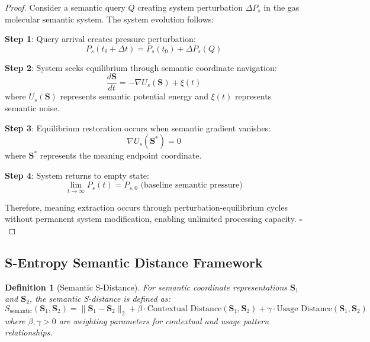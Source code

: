 \documentclass[12pt,a4paper]{article}
\newtheorem{definition}{Definition}
\begin{document}
\begin{proof}
Consider a semantic query $Q$ creating system perturbation $\Delta P_s$ in the gas molecular semantic system. The system evolution follows:

\textbf{Step 1}: Query arrival creates pressure perturbation:
\begin{equation}
P_s(t_0 + \Delta t) = P_s(t_0) + \Delta P_s(Q)
\end{equation}

\textbf{Step 2}: System seeks equilibrium through semantic coordinate navigation:
\begin{equation}
\frac{d\mathbf{S}}{dt} = -\nabla U_s(\mathbf{S}) + \xi(t)
\end{equation}
where $U_s(\mathbf{S})$ represents semantic potential energy and $\xi(t)$ represents semantic noise.

\textbf{Step 3}: Equilibrium restoration occurs when semantic gradient vanishes:
\begin{equation}
\nabla U_s(\mathbf{S}^*) = 0
\end{equation}
where $\mathbf{S}^*$ represents the meaning endpoint coordinate.

\textbf{Step 4}: System returns to empty state:
\begin{equation}
\lim_{t \to \infty} P_s(t) = P_{s,0} \text{ (baseline semantic pressure)}
\end{equation}

Therefore, meaning extraction occurs through perturbation-equilibrium cycles without permanent system modification, enabling unlimited processing capacity. $\square$
\end{proof}

\subsection{S-Entropy Semantic Distance Framework}

\begin{definition}[Semantic S-Distance]
For semantic coordinate representations $\mathbf{S}_1$ and $\mathbf{S}_2$, the semantic S-distance is defined as:
\begin{equation}
S_{\text{semantic}}(\mathbf{S}_1, \mathbf{S}_2) = \|\mathbf{S}_1 - \mathbf{S}_2\|_2 + \beta \cdot \text{Contextual Distance}(\mathbf{S}_1, \mathbf{S}_2) + \gamma \cdot \text{Usage Distance}(\mathbf{S}_1, \mathbf{S}_2)
\end{equation}
where $\beta, \gamma > 0$ are weighting parameters for contextual and usage pattern relationships.
\end{definition}
\end{document}
